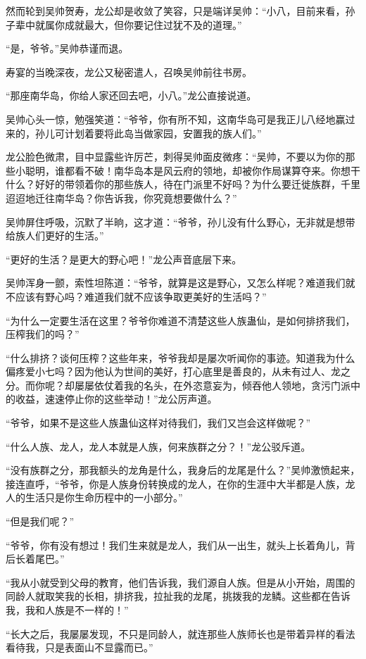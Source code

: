 \begin{this_body}
然而轮到吴帅贺寿，龙公却是收敛了笑容，只是端详吴帅：“小八，目前来看，孙子辈中就属你成就最大，但你要记住过犹不及的道理。”

“是，爷爷。”吴帅恭谨而退。

寿宴的当晚深夜，龙公又秘密遣人，召唤吴帅前往书房。

“那座南华岛，你给人家还回去吧，小八。”龙公直接说道。

吴帅心头一惊，勉强笑道：“爷爷，你有所不知，这南华岛可是我正儿八经地赢过来的，孙儿可计划着要将此岛当做家园，安置我的族人们。”

龙公脸色微肃，目中显露些许厉芒，刺得吴帅面皮微疼：“吴帅，不要以为你的那些小聪明，谁都看不破！南华岛本是风云府的领地，却被你作局谋算夺来。你想干什么？好好的带领着你的那些族人，待在门派里不好吗？为什么要迁徙族群，千里迢迢地迁往南华岛？你告诉我，你究竟想要做什么？”

吴帅屏住呼吸，沉默了半晌，这才道：“爷爷，孙儿没有什么野心，无非就是想带给族人们更好的生活。”

“更好的生活？是更大的野心吧！”龙公声音底层下来。

吴帅浑身一颤，索性坦陈道：“爷爷，就算是这是野心，又怎么样呢？难道我们就不应该有野心吗？难道我们就不应该争取更美好的生活吗？”

“为什么一定要生活在这里？爷爷你难道不清楚这些人族蛊仙，是如何排挤我们，压榨我们的吗？”

“什么排挤？谈何压榨？这些年来，爷爷我却是屡次听闻你的事迹。知道我为什么偏疼爱小七吗？因为他认为世间的美好，打心底里是善良的，从未有过人、龙之分。而你呢？却屡屡依仗着我的名头，在外恣意妄为，倾吞他人领地，贪污门派中的收益，速速停止你的这些举动！”龙公厉声道。

“爷爷，如果不是这些人族蛊仙这样对待我们，我们又岂会这样做呢？”

“什么人族、龙人，龙人本就是人族，何来族群之分？！”龙公驳斥道。

“没有族群之分，那我额头的龙角是什么，我身后的龙尾是什么？”吴帅激愤起来，接连直呼，“爷爷，你是人族身份转换成的龙人，在你的生涯中大半都是人族，龙人的生活只是你生命历程中的一小部分。”

“但是我们呢？”

“爷爷，你有没有想过！我们生来就是龙人，我们从一出生，就头上长着角儿，背后长着尾巴。”

“我从小就受到父母的教育，他们告诉我，我们源自人族。但是从小开始，周围的同龄人就取笑我的长相，排挤我，拉扯我的龙尾，挑拨我的龙鳞。这些都在告诉我，我和人族是不一样的！”

“长大之后，我屡屡发现，不只是同龄人，就连那些人族师长也是带着异样的看法看待我，只是表面山不显露而已。”


\end{this_body}
